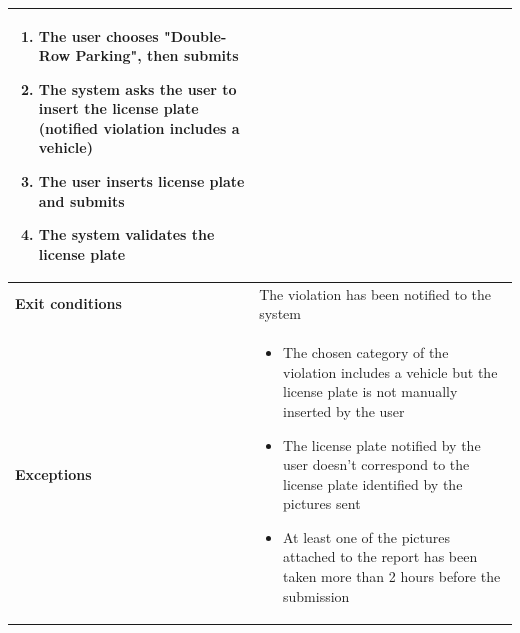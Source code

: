 \begin{description}
\begin{center}
\begin{tabular}{|p{3cm}|p{7cm}|}
\begin{enumerate}
                \item The user chooses "Double-Row Parking", then submits
                \item The system asks the user to insert the license plate (notified violation includes a vehicle) 
                \item The user inserts license plate and submits 
                \item The system validates the license plate
            \end{enumerate} \\
            \hline
            \textbf{Exit conditions} & The violation has been notified to the system \\
            \hline
            \textbf{Exceptions}
            & \begin{itemize}
                \item The chosen category of the violation includes a vehicle but the license plate is not manually inserted by the user
                \item The license plate notified by the user doesn't correspond to the license plate identified by the pictures sent 
                \item At least one of the pictures attached to the report has been taken more than 2 hours before the submission 
            \end{itemize} \\
            \hline
        \end{tabular}
    \end{center}
\end{description}

